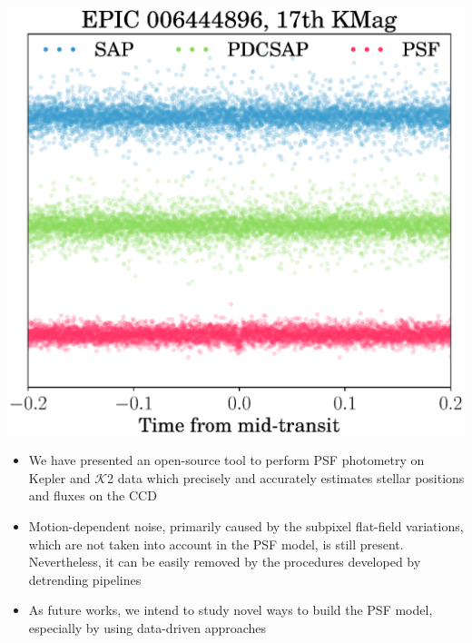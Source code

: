 \documentclass[landscape,a0b,final]{a0poster}
\newenvironment{poster}{
  \begin{center}
  \begin{minipage}[c]{0.98\textwidth}
}{
  \end{minipage}
  \end{center}
}
\newenvironment{pcolumn}[1]{
  \begin{minipage}{#1\textwidth}
  \begin{center}
}{
  \end{center}
  \end{minipage}
}
\newcommand{\pbox}[4]{
\psshadowbox[#3]{
\begin{minipage}[t][#2][t]{#1}
#4
\end{minipage}
}}
\begin{document}
\begin{poster}
\begin{center}
\begin{pcolumn}{0.32}
{    \includegraphics[width=16cm,angle=0]{figs/faint.eps}

\begin{center}\pbox{0.8\textwidth}{}{linewidth=2mm,framearc=0.1,linecolor=lightblue,fillstyle=gradient,gradangle=0,gradbegin=white,gradend=whiteblue,gradmidpoint=1.0,framesep=1em}{\begin{center}\textbf{Conclusions}\end{center}}\end{center}
\vspace{.5cm}

    \begin{itemize}
        \item We have presented an open-source tool to perform PSF photometry on Kepler and $\mathcal{K}$2 data
            which precisely and accurately estimates stellar positions and fluxes on the CCD
        \item Motion-dependent noise, primarily caused by the subpixel flat-field variations, which are not
            taken into account in the PSF model, is still present. Nevertheless, it can be easily removed
            by the procedures developed by detrending pipelines
        \item As future works, we intend to study novel ways to build the PSF model, especially by using
            data-driven approaches
    \end{itemize}




}
\end{pcolumn}
\end{center}

\end{poster}
\end{document}
